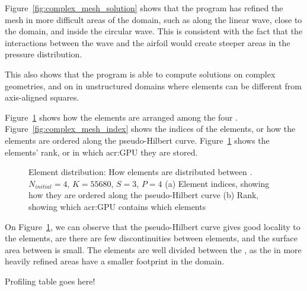 Figure~\ref{fig:complex_mesh_solution} shows that the program has refined the mesh in more difficult
areas of the domain, such as along the linear wave, close to the domain, and inside the circular
wave. This is consistent with the fact that the interactions between the wave and the airfoil would
create steeper areas in the pressure distribution.

This also shows that the program is able to compute solutions on complex geometries, and on in
unstructured domains where elements can be different from axis-aligned squares.

Figure~\ref{fig:complex_mesh_elements} shows how the elements are arranged among the four
. Figure~\ref{fig:complex_mesh_index} shows the indices of the elements, or how
the elements are ordered along the pseudo-Hilbert curve. Figure~\ref{fig:complex_mesh_elements}
shows the elements' rank, or in which \acrshort{acr:GPU} they are stored.

\begin{figure}[H]
	\centering
	\hfill
	\caption{Element distribution: How elements are distributed between . \(N_{initial} = 4\), \(K = 55680\), \(S = 3\), \(P = 4\) (a) Element indices, showing how they are ordered along the pseudo-Hilbert curve (b) Rank, showing which \acrshort{acr:GPU} contains which elements}\label{fig:complex_mesh_elements}
\end{figure}

On Figure~\ref{fig:complex_mesh_elements}, we can observe that the pseudo-Hilbert curve gives good
locality to the elements, are there are few discontinuities between elements, and the surface area
between  is small. The elements are well divided between the
, as the  in more heavily refined areas have a smaller
footprint in the domain.

Profiling table goes here!